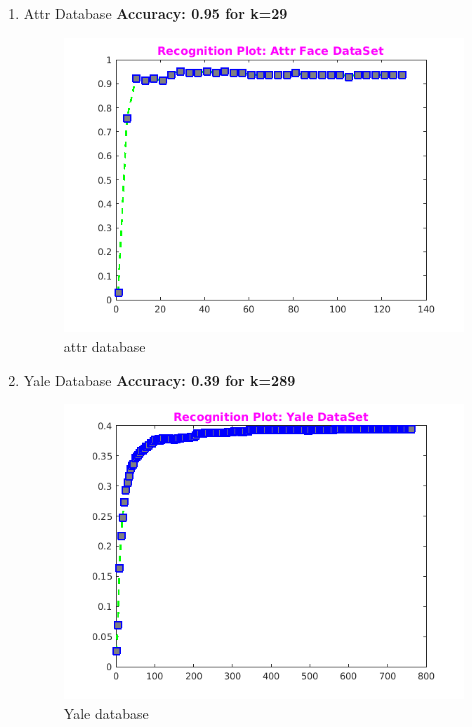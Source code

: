 \documentclass[a4paper,10pt]{report}
\begin{document}
\begin{enumerate}
 \item Attr Database
 \newline
 \textbf{Accuracy: 0.95 for k=29 }\\
 \begin{figure}[h]
	\centering
	\includegraphics[scale=.6]{eigenattr.png}
	\caption{attr database}
	\label{fig.a}
\end{figure}


\newpage

\item Yale Database
 \newline
 \textbf{Accuracy: 0.39 for k=289 }\\

\begin{figure}[h]
	\centering
	\includegraphics[scale=.6]{eigenYale.png}
	\caption{Yale database}
	\label{fig.b}
\end{figure}



\end{enumerate}
\end{document}
